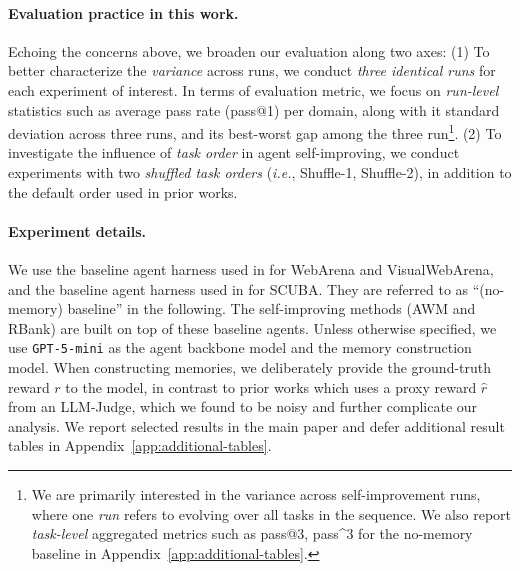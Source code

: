 \documentclass{article}
\begin{document}
\paragraph{Evaluation practice in this work.} Echoing the concerns above, we broaden our evaluation along two axes: (1) To better characterize the \textit{variance} across runs, we conduct \textit{three identical runs} for each experiment of interest. In terms of evaluation metric, we focus on \textit{run-level} statistics such as average pass rate (pass@1) per domain, along with it standard deviation across three runs, and its best-worst gap among the three run\footnote{We are primarily interested in the variance across self-improvement runs, where one \textit{run} refers to evolving over all tasks in the sequence.
We also report \textit{task-level} aggregated metrics such as pass@3, pass\^{}3 for the no-memory baseline in Appendix~\ref{app:additional-tables}.}.
(2) To investigate the influence of \textit{task order} in agent self-improving, we conduct experiments with two \textit{shuffled task orders} (\textit{i.e.}, Shuffle-1, Shuffle-2), in addition to the default order used in prior works.

\paragraph{Experiment details.} We use the baseline agent harness used in \cite{prabhu2026walt} for WebArena and VisualWebArena, and the baseline agent harness used in \cite{dai2025scubasalesforcecomputeruse} for SCUBA. 
They are referred to as ``(no-memory) baseline'' in the following. 
The self-improving methods (AWM and RBank) are built on top of these baseline agents.
Unless otherwise specified, we use \texttt{GPT-5-mini} as the agent backbone model and the memory construction model. When constructing memories, we deliberately provide the ground-truth reward $r$ to the model, in contrast to prior works which uses a proxy reward $\hat{r}$ from an LLM-Judge, which we found to be noisy and further complicate our analysis.
We report selected results in the main paper and defer additional result tables in Appendix~\ref{app:additional-tables}.
\end{document}
